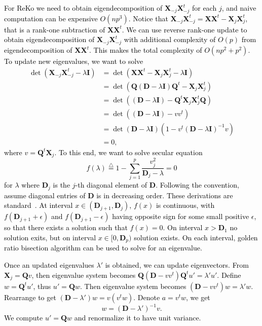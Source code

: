 \documentclass[12pt,Times]{article}
\def\cite{\citep}
\def\tcb{\textcolor{black}}
\def\D{{\mathbf{D}}}
\def\X{{\mathbf{X}}}
\def\Q{{\mathbf{Q}}}
\def\D{{\mathbf{D}}}
\def\I{{\mathbf{I}}}
\begin{document}
\tcb{For ReKo we need to obtain eigendecomposition of $\X_{-j}\X_{-j}^t$ for each $j$, and naive computation can be expensive $O(np^3)$.
Notice that  $\X_{-j}\X_{-j}^t = \X\X^t - \X_j \X_j^t$, that is a rank-one subtraction of $\X\X^t$. We can use reverse rank-one update to obtain eigendecomposition of  $\X_{-j}\X_{-j}^t$ with additional complexity of $O(p)$ from eigendecomposition of $\X\X^t$. This makes the total complexity of $O(np^2+p^2)$.  
To update new eigenvalues, we want to solve 
\begin{equation}
\begin{aligned}
\det(\X_{-j}\X_{-j}^t-\lambda \I) &= \det( \X\X^t - \X_j \X_j^t - \lambda \I) \\
                        &= \det( \Q (\D - \lambda \I) \Q^t - \X_j \X_j^t ) \\
                        &= \det( (\D - \lambda \I) - \Q^t\X_j \X_j^t\Q ) \\
                                  &= \det( (\D - \lambda \I) - vv^t ) \\
                        &= \det(\D-\lambda\I) (1- v^t (\D-\lambda\I)^{-1} v) \\
                        &=0,  
\end{aligned}
\end{equation}
where $v=\Q^t\X_j$. To this end, we want to solve secular equation 
\begin{equation}
f(\lambda) \overset{\triangle}{=}   1-\sum_{j=1}^p \frac{v_j^2}{\D_j -\lambda} = 0
\end{equation}
for $\lambda$ where $\D_j$ is the $j$-th diagonal element of $\D$. Following the convention, assume diagonal entries of $\D$ is in decreasing order.  These derivations are standard~\cite[c.f.][]{golub.13}. 
At interval $x \in (\D_{j+1}, \D_{j})$, $f(x)$ is continuous, with $f(\D_{j+1} + \epsilon)$ and $f(\D_{j+1}-\epsilon)$  having opposite sign for some small positive $\epsilon$, so that there exists a solution such that $f(x) = 0$. On interval $x > \D_1$ no solution exits, but on interval $x \in [0, \D_p)$ solution exists. On each interval, golden ratio bisection algorithm can be used to solve for an eigenvalue. }

\tcb{Once an updated eigenvalues $\lambda'$ is obtained, we can update eigenvectors.  
From $\X_j=\Q v$, then eigenvalue system becomes $\Q(\D - vv^t) \Q^t u' = \lambda' u'$. 
Define $w=\Q^t u'$, thus $u'=\Q w$. Then eigenvalue system becomes $(\D - vv^t) w = \lambda' w.$ Rearrange to get  $(\D - \lambda') w = v (v^t w).$ 
Denote $a=v^tw$, we get   
\begin{equation}
w  = (\D - \lambda')^{-1} v.  
\end{equation}
We  compute $u'=\Q w$ and renormalize it to have unit variance.}
\end{document}
